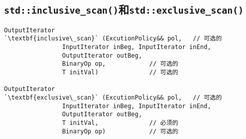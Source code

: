 \subsection{\texttt{std::inclusive\_scan()}和\texttt{std::exclusive\_scan()}}\label{ch23.2.3}
\begin{lstlisting}[frame=single,xleftmargin=13pt,xrightmargin=13pt]
OutputIterator
`\textbf{inclusive\_scan}` (ExcutionPolicy&& pol,   // 可选的
                InputIterator inBeg, InputIterator inEnd,
                OutputIterator outBeg,
                BinaryOp op,            // 可选的
                T initVal)              // 可选的

OutputIterator
`\textbf{exclusive\_scan}` (ExcutionPolicy&& pol,   // 可选的
                InputIterator inBeg, InputIterator inEnd,
                OutputIterator outBeg,
                T initVal,              // 必须的
                BinaryOp op)            // 可选的
\end{lstlisting}
